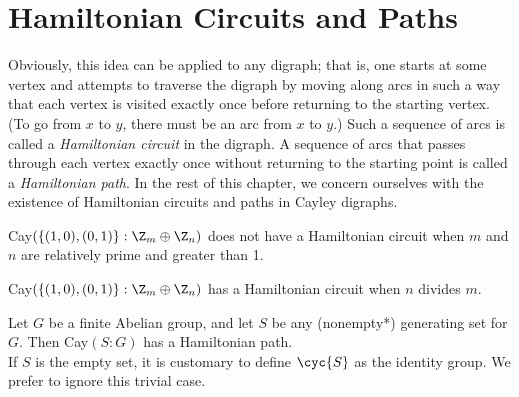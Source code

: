 \section{Hamiltonian Circuits and Paths}

\begin{remark}
	Obviously, this idea can be applied to any digraph; that is, one starts at some vertex and attempts to traverse the digraph by moving along arcs in such a way that each vertex is visited exactly once before returning to the starting vertex. (To go from $x$ to $y$, there must be an arc from $x$ to $y$.) Such a sequence of arcs is called a \textit{Hamiltonian circuit} in the digraph. A sequence of arcs that passes through each vertex exactly once without returning to the starting point is called a \textit{Hamiltonian path}. In the rest of this chapter, we concern ourselves with the existence of Hamiltonian circuits and paths in Cayley digraphs.
\end{remark}

\begin{theorem}
	Cay$(\{(1,0),(0,1)\}:\Z_m \oplus \Z_n)$ does not have a Hamiltonian circuit when $m$ and $n$ are relatively prime and greater than 1.
\end{theorem}

\begin{theorem}
	Cay$(\{(1,0),(0,1)\}:\Z_m \oplus \Z_n)$ has a Hamiltonian circuit when $n$ divides $m$.
\end{theorem}

\begin{theorem}
	Let $G$ be a finite Abelian group, and let $S$ be any (nonempty*) generating set for $G$. Then Cay$(S:G)$ has a Hamiltonian path.\\


	\noindent *If $S$ is the empty set, it is customary to define $\cyc{S}$ as the identity group. We prefer to ignore this trivial case.
\end{theorem}
